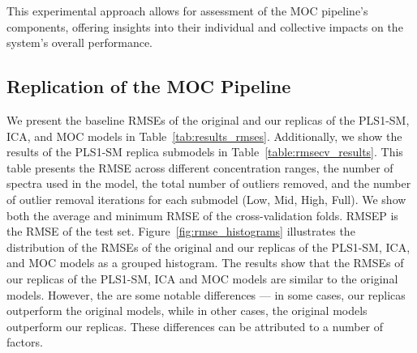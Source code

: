 This experimental approach allows for assessment of the MOC pipeline's components, offering insights into their individual and collective impacts on the system's overall performance.

\subsection{Replication of the MOC Pipeline}\label{sec:replica_moc}
We present the baseline RMSEs of the original and our replicas of the PLS1-SM, ICA, and MOC models in Table~\ref{tab:results_rmses}.
Additionally, we show the results of the PLS1-SM replica submodels in Table~\ref{table:rmsecv_results}. This table presents the RMSE across different concentration ranges, the number of spectra used in the model, the total number of outliers removed, and the number of outlier removal iterations for each submodel (Low, Mid, High, Full). We show both the average and minimum RMSE of the cross-validation folds. RMSEP is the RMSE of the test set.
Figure~\ref{fig:rmse_histograms} illustrates the distribution of the RMSEs of the original and our replicas of the PLS1-SM, ICA, and MOC models as a grouped histogram.
The results show that the RMSEs of our replicas of the PLS1-SM, ICA and MOC models are similar to the original models.
However, the are some notable differences --- in some cases, our replicas outperform the original models, while in other cases, the original models outperform our replicas.
These differences can be attributed to a number of factors.

